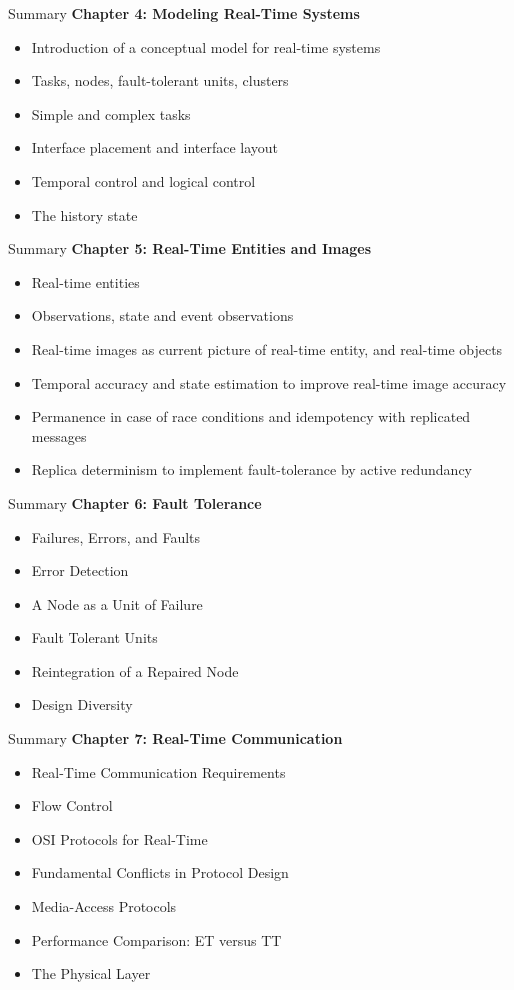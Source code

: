 \begin{frame}{Summary}
\textbf{Chapter 4: Modeling Real-Time Systems}
\begin{itemize}
\item Introduction of a conceptual model for real-time systems
\item Tasks, nodes, fault-tolerant units, clusters
\item Simple and complex tasks
\item Interface placement and interface layout
\item Temporal control and logical control
\item The history state
\end{itemize}
\end{frame}

\begin{frame}{Summary}
\textbf{Chapter 5: Real-Time Entities and Images}
\begin{itemize}
\item Real-time entities
\item Observations, state and event observations
\item Real-time images as current picture of real-time entity, and real-time objects
\item Temporal accuracy and state estimation to improve real-time image accuracy
\item Permanence in case of race conditions and idempotency with replicated messages
\item Replica determinism to implement fault-tolerance by active redundancy
\end{itemize}
\end{frame}

\begin{frame}{Summary}
\textbf{Chapter 6: Fault Tolerance}
\begin{itemize}
\item Failures, Errors, and Faults
\item Error Detection
\item A Node as a Unit of Failure
\item Fault Tolerant Units
\item Reintegration of a Repaired Node
\item Design Diversity
\end{itemize}
\end{frame}

\begin{frame}{Summary}
\textbf{Chapter 7: Real-Time Communication}
\begin{itemize}
\item Real-Time Communication Requirements
\item Flow Control
\item OSI Protocols for Real-Time
\item Fundamental Conflicts in Protocol Design
\item Media-Access Protocols
\item Performance Comparison: ET versus TT
\item The Physical Layer
\end{itemize}
\end{frame}

